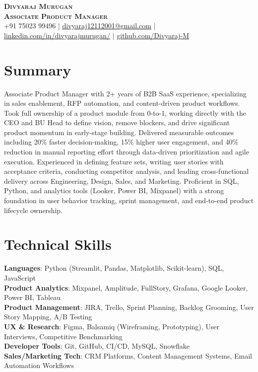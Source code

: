 \documentclass[letterpaper,11pt]{article}
\begin{document}
\begin{center}
    \textbf{\Huge \scshape Divyaraj Murugan} \\ \vspace{1pt}
     \textbf{\large\scshape Associate Product Manager} \\ \vspace{1pt}
    +91 75023 99496 $|$ \href{mailto:divyaraj12112001@gmail.com}{\underline{divyaraj12112001@gmail.com}} $|$
    \href{https://www.linkedin.com/in/divyaraj-murugan-81561b22b}{\underline{linkedin.com/in/divyarajmurugan/}} $|$
    \href{https://github.com/Divyaraj-M}{\underline{github.com/Divyaraj-M}}
\end{center}

\section*{Summary}
Associate Product Manager with 2+ years of B2B SaaS experience, specializing in sales enablement, RFP automation, and content-driven product workflows. Took full ownership of a product module from 0-to-1, working directly with the CEO and BU Head to define vision, remove blockers, and drive significant product momentum in early-stage building. Delivered measurable outcomes including 20\% faster decision-making, 15\% higher user engagement, and 40\% reduction in manual reporting effort through data-driven prioritization and agile execution. Experienced in defining feature sets, writing user stories with acceptance criteria, conducting competitor analysis, and leading cross-functional delivery across Engineering, Design, Sales, and Marketing. Proficient in SQL, Python, and analytics tools (Looker, Power BI, Mixpanel) with a strong foundation in user behavior tracking, sprint management, and end-to-end product lifecycle ownership.

\section{Technical Skills}
\begin{itemize}[leftmargin=0.15in, label={}]
    \small{
    \item{
     \textbf{Languages}{: Python (Streamlit, Pandas, Matplotlib, Scikit-learn), SQL, JavaScript} \\[5pt]
     \textbf{Product Analytics}{: Mixpanel, Amplitude, FullStory, Grafana, Google Looker, Power BI, Tableau} \\[5pt]
     \textbf{Product Management}{: JIRA, Trello, Sprint Planning, Backlog Grooming, User Story Mapping, A/B Testing} \\[5pt]
     \textbf{UX \& Research}{: Figma, Balsamiq (Wireframing, Prototyping), User Interviews, Competitive Benchmarking} \\[5pt]
     \textbf{Developer Tools}{: Git, GitHub, CI/CD, MySQL, Snowflake} \\[5pt]
     \textbf{Sales/Marketing Tech}{: CRM Platforms, Content Management Systems, Email Automation Workflows} \\[5pt]
    }
    }
\end{itemize}
\end{document}
